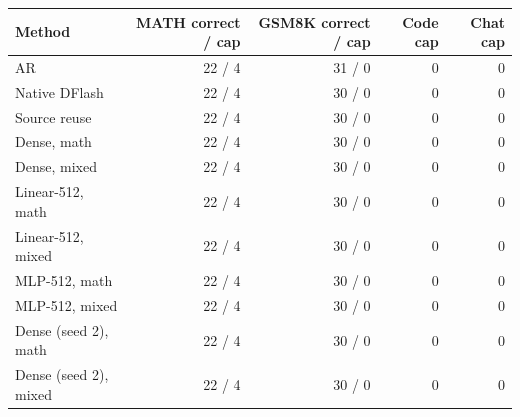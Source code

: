\begin{tabular}{lrrrr}
\toprule
Method & MATH correct / cap & GSM8K correct / cap & Code cap & Chat cap \\
\midrule
AR & 22 / 4 & 31 / 0 & 0 & 0 \\
Native DFlash & 22 / 4 & 30 / 0 & 0 & 0 \\
Source reuse & 22 / 4 & 30 / 0 & 0 & 0 \\
Dense, math & 22 / 4 & 30 / 0 & 0 & 0 \\
Dense, mixed & 22 / 4 & 30 / 0 & 0 & 0 \\
Linear-512, math & 22 / 4 & 30 / 0 & 0 & 0 \\
Linear-512, mixed & 22 / 4 & 30 / 0 & 0 & 0 \\
MLP-512, math & 22 / 4 & 30 / 0 & 0 & 0 \\
MLP-512, mixed & 22 / 4 & 30 / 0 & 0 & 0 \\
Dense (seed 2), math & 22 / 4 & 30 / 0 & 0 & 0 \\
Dense (seed 2), mixed & 22 / 4 & 30 / 0 & 0 & 0 \\
\bottomrule
\end{tabular}
